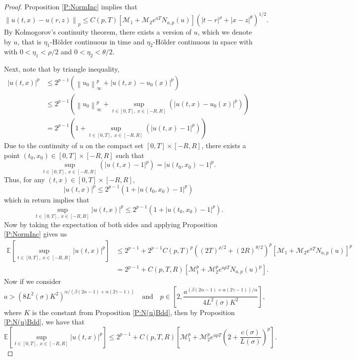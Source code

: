 \documentclass[a4paper,11pt]{article}
\numberwithin{equation}{section}
\theoremstyle{plain}
\theoremstyle{definition}
\newcommand{\Norm}[1]{\left\|  #1   \right\|}
\numberwithin{NQ}{section}
\numberwithin{LQ}{section}
\numberwithin{ZQ}{section}
\begin{document}
	\begin{proof}
Proposition \ref{P:NormInc} implies that 
		\begin{equation}
			\Norm{u(t,x) - u(r,z)}_p \le C(p,T)\left[ \mathcal{M}_1 + \mathcal{M}_2e^{aT}N_{a,p}(u) \right]\left(|t-r|^{\rho} + |x-z|^{\theta}\right)^{1/2}.
		\end{equation}
By Kolmogorov's continuity theorem, there exists a version of $u$, which we denote by $u$, that is $\eta_1$-H\"older continuous in time and $\eta_2$-H\"older continuous in space with with $0<\eta_1 < \rho/2$ and $0<\eta_2 < \theta/2$.
	
Next, note that by triangle inequality,
	\begin{align*}
		|u(t,x)|^p &\le 2^{p-1}\left( \Norm{u_0}_{\infty}^p + |u(t,x)-u_0(x)|^p \right) \\
		&\le 2^{p-1}\left( \Norm{u_0}_{\infty}^p + \sup_{t\in[0,T],\; x\in[-R,R]}\left(|u(t,x)-u_0(x)|^p\right) \right) \\
		&= 2^{p-1}\left( 1 + \sup_{t\in[0,T],\; x\in[-R,R]}\left(|u(t,x)-1|^p\right) \right)
	\end{align*}
Due to the continuity of $u$ on the compact set $[0,T] \times [-R,R]$, there exists a point $(t_0,x_0) \in [0,T] \times [-R,R]$ such that 
	\[
		\sup_{t\in[0,T],\; x\in[-R,R]}\left(|u(t,x)-1|^p\right) = |u(t_0,x_0)-1|^p.
	\]
Thus, for any $(t,x) \in [0,T] \times [-R,R]$,
	\[
		|u(t,x)|^p \le 2^{p-1}\left( 1  + |u(t_0,x_0)-1|^p \right)
	\] 
which in return implies that 
	\[
		\sup_{t\in[0,T],\; x\in[-R,R]} |u(t,x)|^p \le 2^{p-1}\left(1 + |u(t_0,x_0)-1|^p \right).
	\]
Now by taking the expectation of both sides and applying Proposition \ref{P:NormInc} gives us 
	\begin{align*}
			\mathbb{E}\left[ \sup_{t\in[0,T],\; x\in[-R,R]} |u(t,x)|^p \right] &\le  2^{p-1} + 2^{p-1}C(p,T)^p\left((2T)^{\rho/2} + (2R)^{\theta /2}\right)^p\left[ \mathcal{M}_1 + \mathcal{M}_2 e^{aT} N_{a,p}(u)\right]^p \\
			&= 2^{p-1} + C(p,T,R) \left[ \mathcal{M}_1^p + \mathcal{M}_2^p e^{apT} N_{a,p}(u)^p\right].
	\end{align*}
Now if we consider
	\[
		a > \left( 8 L^2(\sigma)K^2\right)^{\alpha/(\beta(2\alpha-1)+\alpha(2\gamma -1))} \quad \text{and} \quad 	p \in \left[ 2, \frac{a^{(\beta(2\alpha-1)+\alpha(2\gamma-1))/\alpha}}{4L^2(\sigma)K^2} \right],
	\]
where $K$ is the constant from Proposition \ref{P:N(u)Bdd}, then by Proposition \ref{P:N(u)Bdd}, we have that 
	\[
		\mathbb{E}\left[ \sup_{t\in[0,T],\; x\in[-R,R]} |u(t,x)|^p \right] \le 2^{p-1} + C(p,T,R) \left[ \mathcal{M}_1^p + \mathcal{M}_2^p e^{apT} \left(2 +  \frac{c(\sigma)}{L(\sigma)}\right)^p\right].
	\]
\end{proof}
\end{document}

